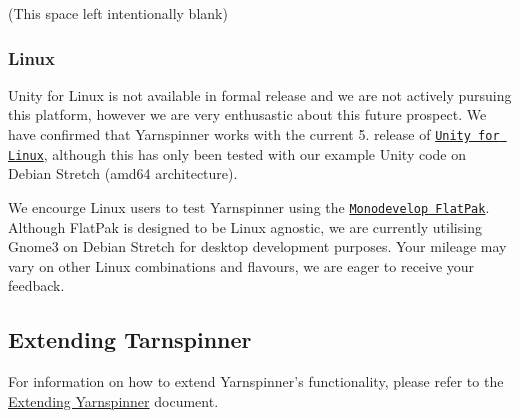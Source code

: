 (This space left intentionally blank)

\subsubsection*{Linux}

Unity for Linux is not available in formal release and we are not actively pursuing this platform, however we are very enthusastic about this future prospect. We have confirmed that Yarnspinner works with the current 5. release of \href{https://forum.unity3d.com/threads/unity-on-linux-release-notes-and-known-issues.350256/}{\tt Unity for Linux}, although this has only been tested with our example Unity code on Debian Stretch (amd64 architecture).

We encourge Linux users to test Yarnspinner using the \href{http://www.monodevelop.com/download/linux/}{\tt Monodevelop Flat\-Pak}. Although Flat\-Pak is designed to be Linux agnostic, we are currently utilising Gnome3 on Debian Stretch for desktop development purposes. Your mileage may vary on other Linux combinations and flavours, we are eager to receive your feedback.

\subsection*{Extending Tarnspinner}

For information on how to extend Yarnspinner's functionality, please refer to the \hyperlink{a00097}{Extending Yarnspinner} document. 